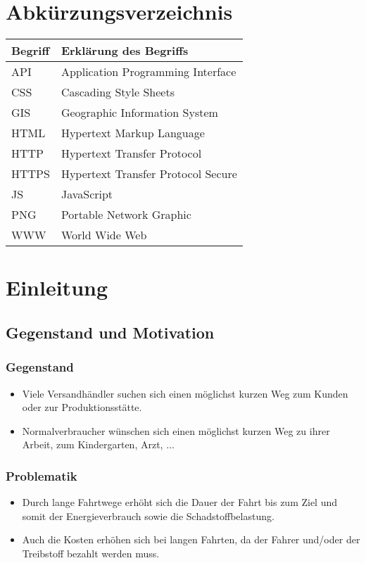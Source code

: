 \documentclass[a4paper, twoside, 12pt]{scrreprt}
\begin{document}
\chapter*{Abkürzungsverzeichnis}
\begin{tabularx}{\textwidth}{lX}
\toprule
\textrm{Begriff}                &\textrm{Erklärung des Begriffs}\\
\midrule
API		&Application Programming Interface\\
CSS		&Cascading Style Sheets\\
GIS		&Geographic Information System \\
HTML	&Hypertext Markup Language\\
HTTP	&Hypertext Transfer Protocol\\
HTTPS	&Hypertext Transfer Protocol Secure\\
JS		&JavaScript\\
PNG		&Portable Network Graphic\\
WWW		&World Wide Web\\

\bottomrule
\end{tabularx}

\chapter{Einleitung}
\section{Gegenstand und Motivation}
\subsection{Gegenstand}
\begin{itemize}
\item Viele Versandhändler suchen sich einen möglichst kurzen Weg zum Kunden oder zur Produktionsstätte.
\item Normalverbraucher wünschen sich einen möglichst kurzen Weg zu ihrer Arbeit, zum Kindergarten, Arzt, $\ldots{}$
\end{itemize}
\subsection{Problematik}
\begin{itemize}
\item Durch lange Fahrtwege erhöht sich die Dauer der Fahrt bis zum Ziel und somit der Energieverbrauch sowie die Schadstoffbelastung.
\item Auch die Kosten erhöhen sich bei langen Fahrten, da der Fahrer und/oder der Treibstoff bezahlt werden muss.
\end{itemize}
\end{document}
